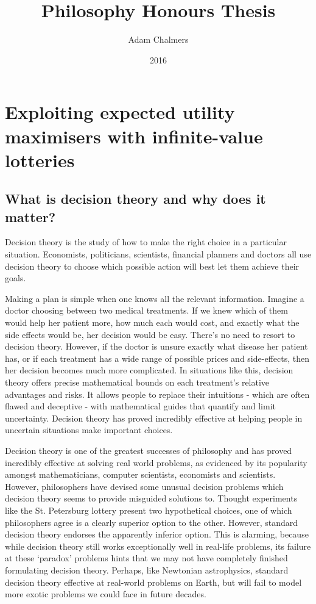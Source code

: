 \documentclass{article}
\title{Philosophy Honours Thesis}
\author{Adam Chalmers}
\date{2016}
\begin{document}
\maketitle

\section{Exploiting expected utility maximisers with infinite-value lotteries}
\subsection{What is decision theory and why does it matter?}

Decision theory is the study of how to make the right choice in a particular situation. Economists, politicians, scientists, financial planners and doctors all use decision theory to choose which possible action will best let them achieve their goals.

Making a plan is simple when one knows all the relevant information. Imagine a doctor choosing between two medical treatments. If we knew which of them would help her patient more, how much each would cost, and exactly what the side effects would be, her decision would be easy. There's no need to resort to decision theory. However, if the doctor is unsure exactly what disease her patient has, or if each treatment has a wide range of possible prices and side-effects, then her decision becomes much more complicated. In situations like this, decision theory offers precise mathematical bounds on each treatment's relative advantages and risks. It allows people to replace their intuitions - which are often flawed and deceptive - with mathematical guides that quantify and limit uncertainty. Decision theory has proved incredibly effective at helping people in uncertain situations make important choices. 

Decision theory is one of the greatest successes of philosophy and has proved incredibly effective at solving real world problems, as evidenced by its popularity amongst mathematicians, computer scientists, economists and scientists. However, philosophers have devised some unusual decision problems which decision theory seems to provide misguided solutions to. Thought experiments like the St. Petersburg lottery present two hypothetical choices, one of which philosophers agree is a clearly superior option to the other. However, standard decision theory endorses the apparently inferior option. This is alarming, because while decision theory still works exceptionally well in real-life problems, its failure at these `paradox' problems hints that we may not have completely finished formulating decision theory. Perhaps, like Newtonian astrophysics, standard decision theory effective at real-world problems on Earth, but will fail to model more exotic problems we could face in future decades.
\end{document}
